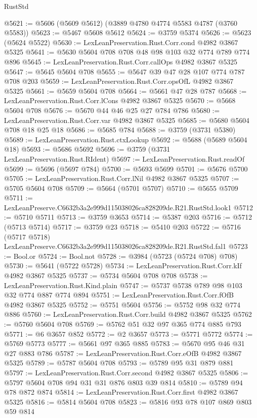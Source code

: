 \begin{lexlean}{RustStd}
\begin{coremodule}
@5621 := @5606 (@5609 @5612) (@3889 @4780 @4774 @5583 @4787 (@3760 @5583))
@5623 := @5467 @5608 @5612
@5624 := @3759 @5374
@5626 := @5623 (@5624 @5522)
@5630 := LexLeanPreservation.Rust.Corr.cond @4982 @3867 @5325
@5641 := @5630 @5604 @708 @708 @48 @98 @103 @32 @774 @789 @774 @896
@5645 := LexLeanPreservation.Rust.Corr.callOps @4982 @3867 @5325
@5647 := @5645 @5604 @708
@5655 := @5647 @39 @47 @28 @107 @774 @787 @708 @203
@5659 := LexLeanPreservation.Rust.Corr.opsOfL @4982 @3867 @5325
@5661 := @5659 @5604 @708
@5664 := @5661 @47 @28 @787
@5668 := LexLeanPreservation.Rust.Corr.lCons @4982 @3867 @5325
@5670 := @5668 @5604 @708
@5676 := @5670 @44 @46 @25 @27 @784 @786
@5680 := LexLeanPreservation.Rust.Corr.var @4982 @3867 @5325
@5685 := @5680 @5604 @708 @18 @25 @18
@5686 := @5685 @784
@5688 := @3759 (@3731 @5380)
@5689 := LexLeanPreservation.Rust.ctxLookup
@5692 := @5688 (@5689 @5604 @18)
@5693 := @5686 @5692
@5696 := @3759 (@3731 LexLeanPreservation.Rust.RIdent)
@5697 := LexLeanPreservation.Rust.readOf
@5699 := @5696 (@5697 @784)
@5700 := @5693 @5699
@5701 := @5676 @5700
@5705 := LexLeanPreservation.Rust.Corr.lNil @4982 @3867 @5325
@5707 := @5705 @5604 @708
@5709 := @5664 (@5701 @5707)
@5710 := @5655 @5709
@5711 := LexLeanPreserve.C6632b3a2e999d115038026ca828209de.R21.RustStd.look1
@5712 := @5710 @5711
@5713 := @3759 @3653
@5714 := @5387 @203
@5716 := @5712 (@5713 @5714)
@5717 := @3759 @23
@5718 := @5410 @203
@5722 := @5716 (@5717 @5718) LexLeanPreserve.C6632b3a2e999d115038026ca828209de.R21.RustStd.fal1
@5723 := Bool.or
@5724 := Bool.not
@5728 := @3984 (@5723 (@5724 @708) @708)
@5730 := @5641 (@5722 @5728)
@5734 := LexLeanPreservation.Rust.Corr.kIf @4982 @3867 @5325
@5737 := @5734 @5604 @708 @708
@5738 := LexLeanPreservation.Rust.Kind.plain
@5747 := @5737 @5738 @789 @98 @103 @32 @774 @887 @774 @894
@5751 := LexLeanPreservation.Rust.Corr.fOfB @4982 @3867 @5325
@5752 := @5751 @5604
@5756 := @5752 @98 @32 @774 @886
@5760 := LexLeanPreservation.Rust.Corr.build @4982 @3867 @5325
@5762 := @5760 @5604 @708
@5769 := @5762 @51 @32 @97 @365 @774 @885 @793
@5771 := @6 @3657 @852
@5772 := @2 @3657
@5773 := @5771 @5772
@5774 := @5769 @5773
@5777 := @5661 @97 @365 @885
@5783 := @5670 @95 @46 @31 @27 @883 @786
@5787 := LexLeanPreservation.Rust.Corr.eOfB @4982 @3867 @5325
@5789 := @5787 @5604 @708
@5793 := @5789 @95 @31 @879 @881
@5797 := LexLeanPreservation.Rust.Corr.second @4982 @3867 @5325
@5806 := @5797 @5604 @708 @94 @31 @31 @876 @803 @39 @814
@5810 := @5789 @94 @78 @872 @874
@5814 := LexLeanPreservation.Rust.Corr.first @4982 @3867 @5325
@5816 := @5814 @5604 @708
@5823 := @5816 @93 @78 @107 @869 @803 @59 @814

\end{coremodule}
\end{lexlean}
